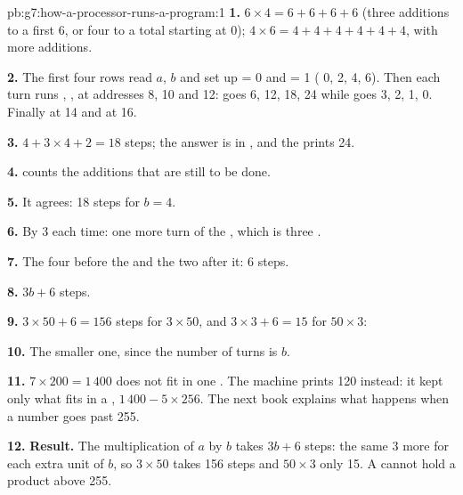 \begin{solution}{pb:g7:how-a-processor-runs-a-program:1}
\textbf{1.} $6 \times 4 = 6 + 6 + 6 + 6$ (three additions to a first 6, or
four to a total starting at 0); $4 \times 6 = 4 + 4 + 4 + 4 + 4 + 4$, with
more additions.

\textbf{2.} The first four rows read $a$, $b$ and set up  = 0 and
 = 1 ( 0, 2, 4, 6). Then each turn runs ,
,  at addresses 8, 10 and 12:  goes 6, 12, 18,
24 while  goes 3, 2, 1, 0. Finally  at 14 and
 at 16.

\textbf{3.} $4 + 3 \times 4 + 2 = 18$ steps; the answer is in , and
the  prints 24.

\textbf{4.}  counts the additions that are still to be done.

\textbf{5.} It agrees: 18 steps for $b = 4$.

\label{out:g7:how-a-processor-runs-a-program:multiply-steps}

\textbf{6.} By 3 each time: one more turn of the , which is three
.

\textbf{7.} The four  before the  and the two after it: 6
steps.

\textbf{8.} $3b + 6$ steps.

\textbf{9.} $3 \times 50 + 6 = 156$ steps for $3 \times 50$, and
$3 \times 3 + 6 = 15$ for $50 \times 3$:

\label{out:g7:how-a-processor-runs-a-program:orders}

\textbf{10.} The smaller one, since the number of turns is $b$.

\textbf{11.} $7 \times 200 = 1\,400$ does not fit in one . The machine
prints 120 instead: it kept only what fits in a , $1\,400 - 5 \times 256$.
The next book explains what happens when a number goes past 255.

\textbf{12.} \textbf{Result.} The multiplication of $a$ by $b$ takes $3b + 6$
steps: the same 3 more for each extra unit of $b$, so $3 \times 50$ takes 156
steps and $50 \times 3$ only 15. A   cannot hold a product
above 255.
\end{solution}
